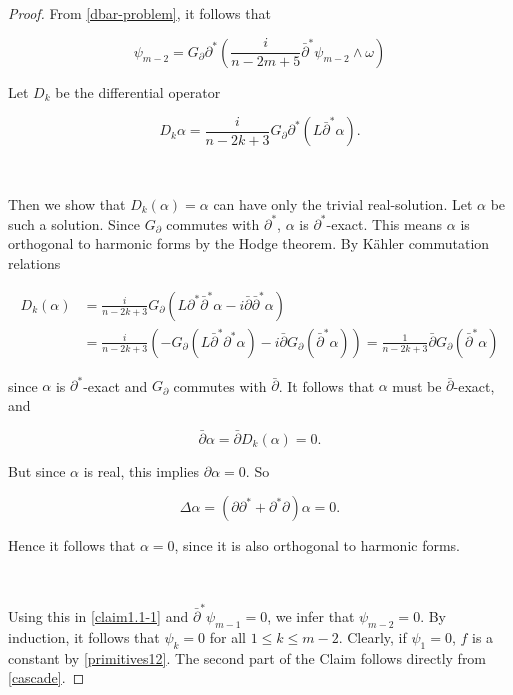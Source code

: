 \documentclass[11pt,letterpaper]{amsart}
\newcommand{\sbpartial}{\bar{\partial}^*}
\newcommand{\bpartial}{\bar{\partial}}
\numberwithin{equation}{section}
\begin{document}
\begin{proof}


From \eqref{dbar-problem}, it follows that 

\begin{equation}\label{claim1.1-1}
    \psi_{m-2} = G_{\partial} \partial^*\left( \frac{i}{n-2m+ 5} \sbpartial \psi_{m-2} \wedge \omega \right)
\end{equation}

Let $D_k$ be the differential operator 

$$D_k \alpha =\frac{i}{n-2k+3} G_{\partial} \partial^*\left(  L \sbpartial \alpha \right).$$

\ 

Then we show that $D_k(\alpha) = \alpha$ can have only the trivial real-solution. Let $\alpha$ be such a solution. Since $G_{\partial}$ commutes with $\partial^*$, $\alpha$ is $\partial^*$-exact. This means $\alpha$ is orthogonal to harmonic forms by the Hodge theorem. By K\"ahler commutation relations

\begin{equation*}
\begin{aligned}
       D_k(\alpha) &= \frac{i}{n-2k+3} G_{\partial}(L \partial^* \sbpartial \alpha - i \bpartial \sbpartial \alpha) \\
       &= \frac{i}{n-2k+3} \left(-G_{\partial}(L \sbpartial \partial^* \alpha) - i \bpartial G_{\partial}(\sbpartial \alpha)\right) = \frac{1}{n-2k+3}  \bpartial G_{\partial}(\sbpartial \alpha)
\end{aligned}
\end{equation*}


\noindent since $\alpha$ is $\partial^*$-exact and $G_{\partial}$ commutes with $\bpartial$. It follows that $\alpha$ must be $\bpartial$-exact, and


$$\bpartial \alpha = \bpartial D_k(\alpha) = 0.$$

But since $\alpha$ is real, this implies $\partial \alpha =0$. So 

$$\Delta \alpha = (\partial \partial^* +\partial^* \partial) \alpha = 0. $$

Hence it follows that $\alpha = 0$, since it is also orthogonal to harmonic forms. 

\



Using this in \eqref{claim1.1-1} and $\sbpartial \psi_{m-1} =0$, we infer that $\psi_{m-2} = 0$. By induction, it follows that $\psi_{k} =0$ for all $1 \leq  k \leq m-2$. Clearly, if $\psi_1 = 0$, $f$ is a constant by \eqref{primitives12}. The second part of the Claim follows directly from  \eqref{cascade}.




\end{proof}
\end{document}
